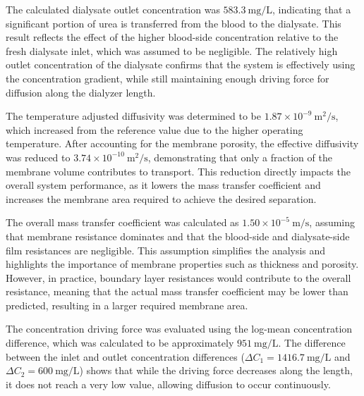\documentclass[10.5pt]{article}
\begin{document}
\vspace{0.3cm}

The calculated dialysate outlet concentration was $583.3 \ \text{mg/L}$, indicating that a significant portion of urea is transferred from the blood to the dialysate. This result reflects the effect of the higher blood-side concentration relative to the fresh dialysate inlet, which was assumed to be negligible. The relatively high outlet concentration of the dialysate confirms that the system is effectively using the concentration gradient, while still maintaining enough driving force for diffusion along the dialyzer length.

\vspace{0.3cm}


The temperature adjusted diffusivity was determined to be $1.87 \times 10^{-9} \ \text{m}^2/\text{s}$, which increased from the reference value due to the higher operating temperature. After accounting for the membrane porosity, the effective diffusivity was reduced to $3.74 \times 10^{-10} \ \text{m}^2/\text{s}$, demonstrating that only a fraction of the membrane volume contributes to transport. This reduction directly impacts the overall system performance, as it lowers the mass transfer coefficient and increases the membrane area required to achieve the desired separation.

\vspace{0.3cm}


The overall mass transfer coefficient was calculated as $1.50 \times 10^{-5} \ \text{m/s}$, assuming that membrane resistance dominates and that the blood-side and dialysate-side film resistances are negligible. This assumption simplifies the analysis and highlights the importance of membrane properties such as thickness and porosity. However, in practice, boundary layer resistances would contribute to the overall resistance, meaning that the actual mass transfer coefficient may be lower than predicted, resulting in a larger required membrane area.

\vspace{0.3cm}


The concentration driving force was evaluated using the log-mean concentration difference, which was calculated to be approximately $951 \ \text{mg/L}$. The difference between the inlet and outlet concentration differences ($\Delta C_1 = 1416.7 \ \text{mg/L}$ and $\Delta C_2 = 600 \ \text{mg/L}$) shows that while the driving force decreases along the length, it does not reach a very low value, allowing diffusion to occur continuously.
\end{document}

